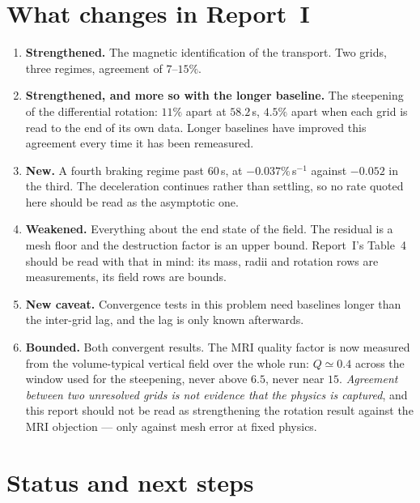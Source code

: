 \documentclass[11pt,a4paper]{article}
\begin{document}
\section{What changes in Report~I}

\begin{enumerate}\itemsep3pt
\item \textbf{Strengthened.} The magnetic identification of the transport. Two
      grids, three regimes, agreement of $7$--$15\%$.
\item \textbf{Strengthened, and more so with the longer baseline.} The
      steepening of the differential rotation: $11\%$ apart at $58.2$\,s,
      $4.5\%$ apart when each grid is read to the end of its own data. Longer
      baselines have improved this agreement every time it has been remeasured.
\item \textbf{New.} A fourth braking regime past $60$\,s, at
      $-0.037\%$\,s$^{-1}$ against $-0.052$ in the third. The deceleration
      continues rather than settling, so no rate quoted here should be read as
      the asymptotic one.
\item \textbf{Weakened.} Everything about the end state of the field. The
      residual is a mesh floor and the destruction factor is an upper bound.
      Report~I's Table~4 should be read with that in mind: its mass, radii and
      rotation rows are measurements, its field rows are bounds.
\item \textbf{New caveat.} Convergence tests in this problem need baselines
      longer than the inter-grid lag, and the lag is only known afterwards.
\item \textbf{Bounded.} Both convergent results. The MRI quality factor is now
      measured from the volume-typical vertical field over the whole run:
      $Q \simeq 0.4$ across the window used for the steepening, never above
      $6.5$, never near $15$. \emph{Agreement between two unresolved grids is
      not evidence that the physics is captured}, and this report should not be
      read as strengthening the rotation result against the MRI objection ---
      only against mesh error at fixed physics.
\end{enumerate}

\section*{Status and next steps}
\end{document}
